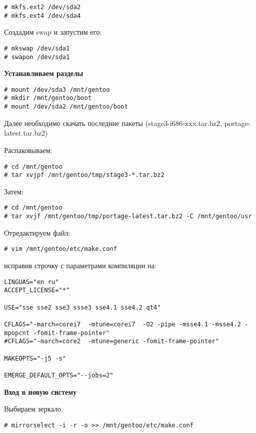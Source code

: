 \documentclass[12pt, a4paper]{article}
\begin{document}
\begin{verbatim}
# mkfs.ext2 /dev/sda2
# mkfs.ext4 /dev/sda4
\end{verbatim}

Создадим swap и запустим его:

\begin{verbatim}
# mkswap /dev/sda1
# swapon /dev/sda1
\end{verbatim}

{\bf Устанавливаем разделы}

\begin{verbatim}
# mount /dev/sda3 /mnt/gentoo
# mkdir /mnt/gentoo/boot
# mount /dev/sda2 /mnt/gentoo/boot
\end{verbatim}

Далее необходимо скачать последние пакеты (stage3-i686-xxx.tar.bz2, portage-latest.tar.bz2)

Распаковываем:

\begin{verbatim}
# cd /mnt/gentoo
# tar xvjpf /mnt/gentoo/tmp/stage3-*.tar.bz2
\end{verbatim}

Затем:

\begin{verbatim}
# cd /mnt/gentoo
# tar xvjf /mnt/gentoo/tmp/portage-latest.tar.bz2 -C /mnt/gentoo/usr
\end{verbatim}

Отредактируем файл:

\begin{verbatim}
# vim /mnt/gentoo/etc/make.conf
\end{verbatim}

исправив строчку с параметрами компиляции на:

\begin{verbatim}
LINGUAS="en ru"
ACCEPT_LICENSE="*"

USE="sse sse2 sse3 ssse3 sse4.1 sse4.2 qt4"

CFLAGS="-march=corei7  -mtune=corei7  -O2 -pipe -msse4.1 -msse4.2 -mpopcnt -fomit-frame-pointer"
#CFLAGS="-march=core2  -mtune=generic -fomit-frame-pointer"

MAKEOPTS="-j5 -s"

EMERGE_DEFAULT_OPTS="--jobs=2"
\end{verbatim}


{\bf Вход в новую систему}


Выбираем зеркало.

\begin{verbatim}
# mirrorselect -i -r -o >> /mnt/gentoo/etc/make.conf
\end{verbatim}
\end{document}
